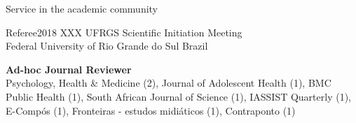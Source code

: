 \begin{rSection}{Service in the academic community}

\begin{rSubsection}
{Referee}{2018}
{XXX UFRGS Scientific Initiation Meeting}\\
{Federal University of Rio Grande do Sul} \hfill {Brazil}
\end{rSubsection}

\textbf{Ad-hoc Journal Reviewer}\\
{Psychology, Health \& Medicine} (2), {Journal of Adolescent Health} (1), {BMC Public Health} (1), {South African Journal of Science} (1), {IASSIST Quarterly} (1), {E-Compós} (1), {Fronteiras - estudos midiáticos} (1), {Contraponto} (1)

\end{rSection}
\vspace{1em}
